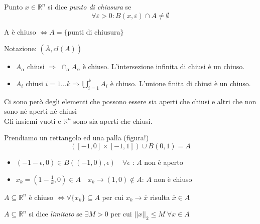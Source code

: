 \begin{defn} 
 Punto $x \in \mathbb{R}^{n}$ si dice \emph{punto di chiusura} se
 $$ \forall \varepsilon > 0: B(x, \varepsilon) \cap A \neq \emptyset $$
\end{defn}

\begin{property}
 A è chiuso $\Longleftrightarrow  A = \{ \text{punti di chiusura} \}$
\end{property}
Notazione:
$(\overline{A}, cl(A))$


\begin{property}
\begin{itemize}
 \item $A_{\alpha}$ chiusi $\Rightarrow$ $\cap_{\alpha} A_{\alpha}$ è chiuso.
  L'intersezione infinita di chiusi è un chiuso.
 \item $A_{i}$ chiusi $i=1 \ldots k \Rightarrow 
\displaystyle \bigcup_{i=1}^{k}A_{i}$ è chiuso.
L'unione finita di chiusi è un chiuso.
\end{itemize}

Ci sono per\`o degli elementi che possono essere sia aperti che chiusi e altri che non sono né aperti né chiusi \\
Gli insiemi vuoti e $\mathbb{R}^{n}$ sono sia aperti che chiusi.
\end{property}

\begin{example}
 Prendiamo un rettangolo ed una palla (figura!)
$$([-1,0] \times [-1,1]) \cup B(0,1) = A$$
\begin{itemize}
\item 
   $(-1- \epsilon, 0) \in B((-1,0),\epsilon) \quad \forall \epsilon$
   :  $A$ non è aperto
\item 
   $x_k = (1 - \frac{1}{k},0) \in A \quad x_k \rightarrow (1,0) 
 \notin A $: $A$ non è chiuso
\end{itemize}
\end{example}

\begin{property}
$A \subseteq \mathbb{R}^n $ è chiuso $\Longleftrightarrow
 \forall \{ x_k \} \subseteq A $ per cui $x_k  \rightarrow \overline{x}$
risulta $\overline{x} \in A $
\end{property}

\begin{defn}
$A \subseteq \mathbb{R}^{n}$ si dice \emph{limitato}  se $\exists M > 0$ per cui
$|| x ||_{2} \leq M \; \forall x \in A $
\end{defn}

